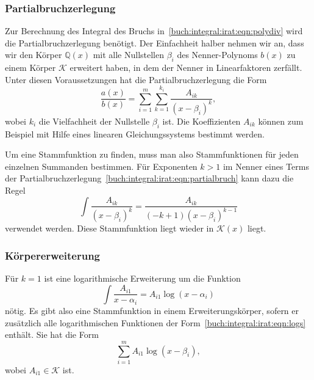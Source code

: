 \subsubsection{Partialbruchzerlegung}
Zur Berechnung des Integral des Bruchs
in~\eqref{buch:integral:irat:eqn:polydiv} wird die Partialbruchzerlegung
benötigt.
Der Einfachheit halber nehmen wir an, dass wir den Körper $\mathbb{Q}(x)$
mit alle Nullstellen $\beta_i$ des Nenner-Polynoms $b(x)$ zu einem Körper
$\mathscr{K}$ erweitert haben, in dem der Nenner in Linearfaktoren zerfällt.
Unter diesen Voraussetzungen hat die Partialbruchzerlegung die Form
\begin{equation}
\frac{a(x)}{b(x)}
=
\sum_{i=1}^m
\sum_{k=1}^{k_i}
\frac{A_{ik}}{(x-\beta_i)^k},
\label{buch:integral:irat:eqn:partialbruch}
\end{equation}
wobei $k_i$ die Vielfachheit der Nullstelle $\beta_i$ ist.
Die Koeffizienten $A_{ik}$ können zum Beispiel mit Hilfe eines linearen
Gleichungssystems bestimmt werden.

Um eine Stammfunktion zu finden, muss man also Stammfunktionen für
jeden einzelnen Summanden bestimmen.
Für Exponenten $k>1$ im Nenner eines Terms der
Partialbruchzerlegung~\eqref{buch:integral:irat:eqn:partialbruch}
kann dazu die Regel
\[
\int \frac{A_{ik}}{(x-\beta_i)^k}
=
\frac{A_{ik}}{(-k+1)(x-\beta_i)^{k-1}}
\]
verwendet werden.
Diese Stammfunktion liegt wieder in $\mathscr{K}(x)$ liegt.

%
%
\subsubsection{Körpererweiterung}
Für $k=1$ ist eine logarithmische Erweiterung um die Funktion
\begin{equation}
\int \frac{A_{i1}}{x-\alpha_i}
=
A_{i1}
\log(x-\alpha_i)
\label{buch:integral:irat:eqn:logs}
\end{equation}
nötig.
Es gibt also eine Stammfunktion in einem Erweiterungskörper, sofern
er zusätzlich alle logarithmischen Funktionen
der Form~\ref{buch:integral:irat:eqn:logs} enthält.
Sie hat die Form
\[
\sum_{i=1}^m A_{i1} \log(x-\beta_i),
\]
wobei $A_{i1}\in\mathscr{K}$ ist.

